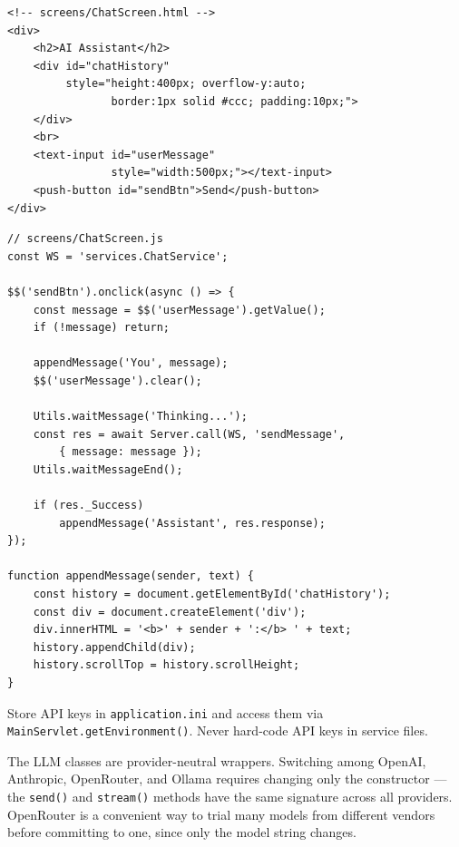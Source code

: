 \begin{lstlisting}[style=html]
<!-- screens/ChatScreen.html -->
<div>
    <h2>AI Assistant</h2>
    <div id="chatHistory"
         style="height:400px; overflow-y:auto;
                border:1px solid #ccc; padding:10px;">
    </div>
    <br>
    <text-input id="userMessage"
                style="width:500px;"></text-input>
    <push-button id="sendBtn">Send</push-button>
</div>
\end{lstlisting}

\begin{lstlisting}[style=javascript]
// screens/ChatScreen.js
const WS = 'services.ChatService';

$$('sendBtn').onclick(async () => {
    const message = $$('userMessage').getValue();
    if (!message) return;

    appendMessage('You', message);
    $$('userMessage').clear();

    Utils.waitMessage('Thinking...');
    const res = await Server.call(WS, 'sendMessage',
        { message: message });
    Utils.waitMessageEnd();

    if (res._Success)
        appendMessage('Assistant', res.response);
});

function appendMessage(sender, text) {
    const history = document.getElementById('chatHistory');
    const div = document.createElement('div');
    div.innerHTML = '<b>' + sender + ':</b> ' + text;
    history.appendChild(div);
    history.scrollTop = history.scrollHeight;
}
\end{lstlisting}

\begin{tipbox}
Store API keys in \texttt{application.ini} and access them via \texttt{MainServlet.getEnvironment()}.  Never hard-code API keys in service files.
\end{tipbox}

\begin{notebox}
The LLM classes are provider-neutral wrappers.  Switching among OpenAI, Anthropic, OpenRouter, and Ollama requires changing only the constructor --- the \texttt{send()} and \texttt{stream()} methods have the same signature across all providers.  OpenRouter is a convenient way to trial many models from different vendors before committing to one, since only the model string changes.
\end{notebox}
